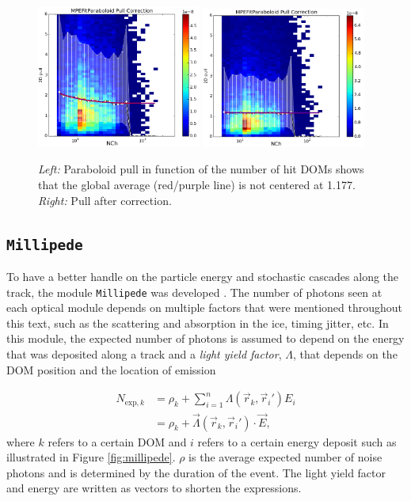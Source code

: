 \begin{figure}[t]
\centering
\includegraphics[width=0.48\textwidth]{chapter7/img/pullbeforecorrection.png}
\includegraphics[width=0.48\textwidth]{chapter7/img/pullaftercorrection.png}
\caption{\textit{Left: }Paraboloid pull in function of the number of hit DOMs shows that the global average (red/purple line) is not centered at 1.177. \textit{Right: }Pull after correction.}
\label{fig:paraboloidpull}
\end{figure}

\subsection{\texttt{Millipede}}
\label{subsec:millipede}
To have a better handle on the particle energy and stochastic cascades along the track, the module \texttt{Millipede} was developed \cite{millipedeinternal, Aartsen:2013vja}. The number of photons seen at each optical module depends on multiple factors that were mentioned throughout this text, such as the scattering and absorption in the ice, timing jitter, etc. In this module, the expected number of photons is assumed to depend on the energy that was deposited along a track and a \textit{light yield factor}, $\Lambda$, that depends on the DOM position and the location of emission

\begin{equation}
\label{eq:n_exp}
\begin{split}
N_{\textrm{exp},k} &= \rho_k + \sum^n_{i=1} \Lambda(\vec{r}_k,\vec{r}_i') E_i\\
&= \rho_k + \vec{\Lambda}(\vec{r}_k,\vec{r}_i') \cdot \vec{E},
\end{split}
\end{equation}
where $k$ refers to a certain DOM and $i$ refers to a certain energy deposit such as illustrated in Figure \ref{fig:millipede}. $\rho$ is the average expected number of noise photons and is determined by the duration of the event. The light yield factor and energy are written as vectors to shorten the expressions. 

